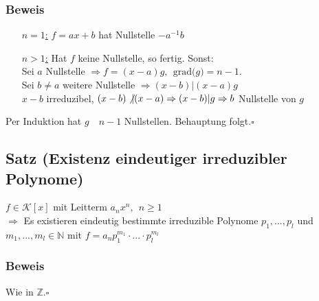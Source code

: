 \documentclass[a4paper, 12pt,titlepage, pdf, headsepline]{scrartcl}
\newcommand{\grad}[1]{\textrm{grad(}#1\textrm{)}}
\newcommand{\N}{\mathds{N}}
\newcommand{\K}{\mathcal{K}}
\newcommand{\uline}[1]{\underline{#1}}
\newcommand{\qed}{\hfill$\square$}
\renewcommand{\>}{\rightarrow}
\renewcommand{\*}{\cdot}
\begin{document}
		      	\subsubsection*{Beweis}
		      	\begin{itemize}
		      		\item[\uline{$n=1$:}] $f = ax +b$ hat Nullstelle $-a^{-1}b$
		      		\item[\uline{$n>1$:}] Hat $f$ keine Nullstelle, so fertig. Sonst: \\
		      		      Sei $a$ Nullstelle $\Rightarrow f = (x-a)g, ~~\grad{g} = n-1$. \\
		      		      Sei $b \neq a$ weitere Nullstelle $\Rightarrow (x-b) \vert (x-a)g$\\
		      		      $x -b$ irreduzibel, $(x-b) \not \vert (x-a) \Rightarrow (x-b) \vert g\\ \Rightarrow b$ Nullstelle von $g$ 
		      	\end{itemize}
		      	Per Induktion hat $g \quad n-1$ Nullstellen. Behauptung folgt.\qed
		      	\subsection{Satz (Existenz eindeutiger irreduzibler Polynome)}
		      	$f \in \K[x]$ mit Leitterm $a_nx^n, ~~n \geq 1$ \\
		      	$\Rightarrow$ Es existieren eindeutig bestimmte irreduzible Polynome $p_1,...,p_l$ und $m_1,...,m_l\in \N$ mit $f = a_n p_1^{m_1} \cdot ... \cdot p_l^{m_l}$ 
		      	\subsubsection*{Beweis} Wie in $\mathds{Z}$.\qed
\end{document}
